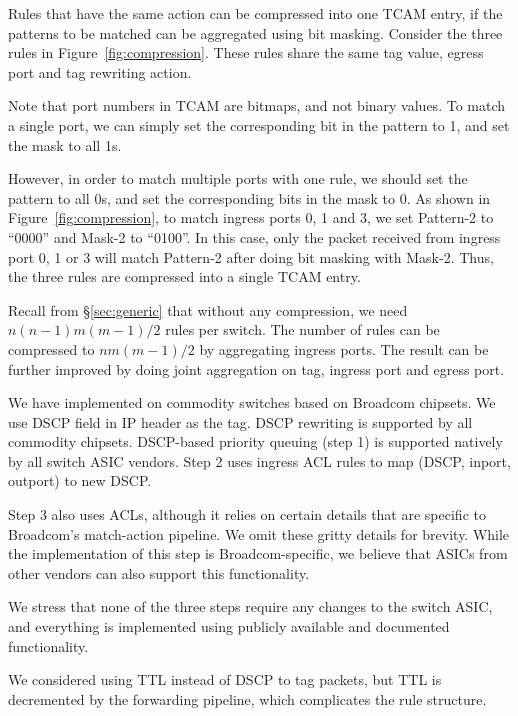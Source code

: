Rules that have the same action can be compressed into one TCAM entry, if the
patterns to be matched can be aggregated using bit masking. Consider the three
rules in Figure~\ref{fig:compression}. These rules share the same tag value,
egress port and tag rewriting action.

Note that port numbers in TCAM are bitmaps, and not binary values. To match a single port, we can simply set the corresponding bit in the pattern to 1, and set the mask to all 1s. 

However, in order to match multiple ports with one rule, we should set the pattern to all 0s, and set the corresponding bits in the mask to 0. As shown in Figure~\ref{fig:compression},  to match ingress ports 0, 1 and 3, we set Pattern-2 to ``0000''  and Mask-2 to ``0100''. In this case, only the packet received from ingress port 0, 1 or 3 will match Pattern-2 after doing bit masking with Mask-2. Thus, the three \sysname{} rules are compressed into
a single TCAM entry.

Recall from \S\ref{sec:generic} that without any compression, we need
$n(n-1)m(m-1)/2$ rules per switch. The number of rules can be
compressed to $nm(m-1)/2$ by aggregating ingress ports.  The
result can be further improved by doing joint aggregation on tag, ingress port and
egress port.

 We have implemented \sysname{} on commodity
switches based on Broadcom chipsets.  We use DSCP field in IP header as the tag.
DSCP rewriting is supported by all commodity chipsets. DSCP-based priority
queuing (step 1) is supported natively by all switch ASIC vendors. Step 2 uses
ingress ACL rules to map (DSCP, inport, outport) to new DSCP.

Step 3 also uses ACLs, although it relies on certain details that are specific
to Broadcom's match-action pipeline. We omit these gritty details for brevity.
While the implementation of this step is Broadcom-specific, we believe that
ASICs from other vendors can also support this functionality.

We stress that none of the three steps require any changes to the switch ASIC,
and everything is implemented using publicly available and documented
functionality.

We considered using TTL instead of DSCP to tag packets, but TTL is decremented
by the forwarding pipeline, which complicates the rule structure.

